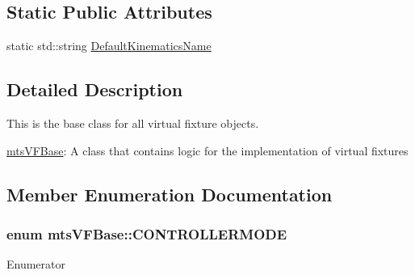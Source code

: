 \subsection*{Static Public Attributes}
\begin{DoxyCompactItemize}
\item 
static std\-::string \hyperlink{classmts_v_f_base_a0e57cd2efaf96320f7bcceb6964cebe8}{Default\-Kinematics\-Name}
\end{DoxyCompactItemize}


\subsection{Detailed Description}
This is the base class for all virtual fixture objects. 

\hyperlink{classmts_v_f_base}{mts\-V\-F\-Base}\-: A class that contains logic for the implementation of virtual fixtures 

\subsection{Member Enumeration Documentation}
\hypertarget{classmts_v_f_base_a742dd08f8b70bafeb746cec14d9ee974}{
\subsubsection[{C\-O\-N\-T\-R\-O\-L\-L\-E\-R\-M\-O\-D\-E}]{\setlength{\rightskip}{0pt plus 5cm}enum {\bf mts\-V\-F\-Base\-::\-C\-O\-N\-T\-R\-O\-L\-L\-E\-R\-M\-O\-D\-E}}}\label{classmts_v_f_base_a742dd08f8b70bafeb746cec14d9ee974}
\begin{Desc}
\item[Enumerator]\par
\begin{description}
\item[{\em 
\hypertarget{classmts_v_f_base_a742dd08f8b70bafeb746cec14d9ee974a6639d5ab298255f1c757007f7f95a348}{J\-P\-O\-S}\label{classmts_v_f_base_a742dd08f8b70bafeb746cec14d9ee974a6639d5ab298255f1c757007f7f95a348}
}]\item[{\em 
\hypertarget{classmts_v_f_base_a742dd08f8b70bafeb746cec14d9ee974ad7f45d2df799c9b4af6977e674b69a84}{J\-V\-E\-L}\label{classmts_v_f_base_a742dd08f8b70bafeb746cec14d9ee974ad7f45d2df799c9b4af6977e674b69a84}
}]\end{description}
\end{Desc}


